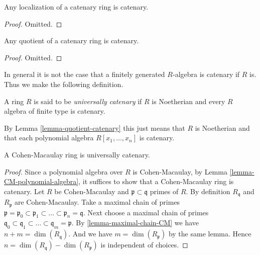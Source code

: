\begin{lemma}
\label{lemma-localization-catenary}
Any localization of a catenary ring is catenary.
\end{lemma}

\begin{proof}
Omitted.
\end{proof}

\begin{lemma}
\label{lemma-quotient-catenary}
Any quotient of a catenary ring is catenary.
\end{lemma}

\begin{proof}
Omitted.
\end{proof}

\noindent
In general it is not the case that a finitely generated
$R$-algebra is catenary if $R$ is. Thus we make the following
definition.

\begin{definition}
\label{definition-universally-catenary}
A ring $R$ is said to be {\it universally catenary}
if $R$ is Noetherian and every $R$ algebra of finite
type is catenary.
\end{definition}

\noindent
By Lemma \ref{lemma-quotient-catenary}
this just means that $R$ is Noetherian
and that each polynomial algebra $R[x_1,\ldots,x_n]$
is catenary.

\begin{lemma}
\label{lemma-CM-ring-catenary}
A Cohen-Macaulay ring is universally catenary.
\end{lemma}

\begin{proof}
Since a polynomial algebra over $R$ is Cohen-Macaulay,
by Lemma \ref{lemma-CM-polynomial-algebra},
it suffices to show that a Cohen-Macaulay ring is
catenary.
Let $R$ be Cohen-Macaulay and $\mathfrak p \subset \mathfrak q$
primes of $R$. By definition $R_{\mathfrak q}$ and
$R_{\mathfrak p}$ are Cohen-Macaulay.
Take a maximal chain of primes
$\mathfrak p = \mathfrak p_0 \subset \mathfrak p_1 \subset
\ldots \subset \mathfrak p_n = \mathfrak q$.
Next choose a maximal chain of primes
$\mathfrak q_0 \subset \mathfrak q_1 \subset \ldots \subset
\mathfrak q_m = \mathfrak p$.
By \ref{lemma-maximal-chain-CM} we have
$n + m = \dim(R_{\mathfrak q})$. And we have
$m = \dim(R_{\mathfrak p})$ by the same lemma.
Hence $n = \dim(R_{\mathfrak q}) - \dim(R_{\mathfrak p})$
is independent of choices.
\end{proof}















